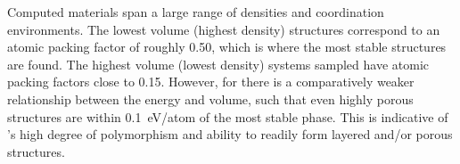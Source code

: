 Computed materials span a large range of densities and coordination environments.
%
%
The lowest volume (highest density) structures correspond to an atomic packing factor of roughly \num{0.50}, which is where the most stable structures are found.
%
The highest volume (lowest density) systems sampled have atomic packing factors close to \num{0.15}.
%
However, for \IrOthree there is a comparatively weaker relationship between the energy and volume, such that even highly porous structures are within \SI{0.1}{\electronvolt}/atom of the most stable phase.
%
This is indicative of \IrOthree's high degree of polymorphism and ability to readily form layered and/or porous structures.
%
%


